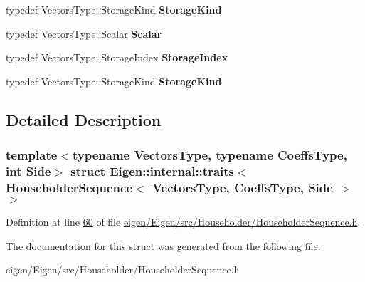 \begin{DoxyCompactItemize}
typedef Vectors\+Type\+::\+Storage\+Kind {\bfseries Storage\+Kind}
\item 
\mbox{\label{struct_eigen_1_1internal_1_1traits_3_01_householder_sequence_3_01_vectors_type_00_01_coeffs_type_00_01_side_01_4_01_4_a9ede8dfbf4a63e58b5a9b1c18a545ace}} 
typedef Vectors\+Type\+::\+Scalar {\bfseries Scalar}
\item 
\mbox{\label{struct_eigen_1_1internal_1_1traits_3_01_householder_sequence_3_01_vectors_type_00_01_coeffs_type_00_01_side_01_4_01_4_a178edf36545f29db3ec5052a7a79d33d}} 
typedef Vectors\+Type\+::\+Storage\+Index {\bfseries Storage\+Index}
\item 
\mbox{\label{struct_eigen_1_1internal_1_1traits_3_01_householder_sequence_3_01_vectors_type_00_01_coeffs_type_00_01_side_01_4_01_4_a270a1e2a935fb1e006b2eca85157cf7b}} 
typedef Vectors\+Type\+::\+Storage\+Kind {\bfseries Storage\+Kind}
\end{DoxyCompactItemize}


\subsection{Detailed Description}
\subsubsection*{template$<$typename Vectors\+Type, typename Coeffs\+Type, int Side$>$\newline
struct Eigen\+::internal\+::traits$<$ Householder\+Sequence$<$ Vectors\+Type, Coeffs\+Type, Side $>$ $>$}



Definition at line \hyperlink{eigen_2_eigen_2src_2_householder_2_householder_sequence_8h_source_l00060}{60} of file \hyperlink{eigen_2_eigen_2src_2_householder_2_householder_sequence_8h_source}{eigen/\+Eigen/src/\+Householder/\+Householder\+Sequence.\+h}.



The documentation for this struct was generated from the following file\+:\begin{DoxyCompactItemize}
\item 
eigen/\+Eigen/src/\+Householder/\+Householder\+Sequence.\+h\end{DoxyCompactItemize}
